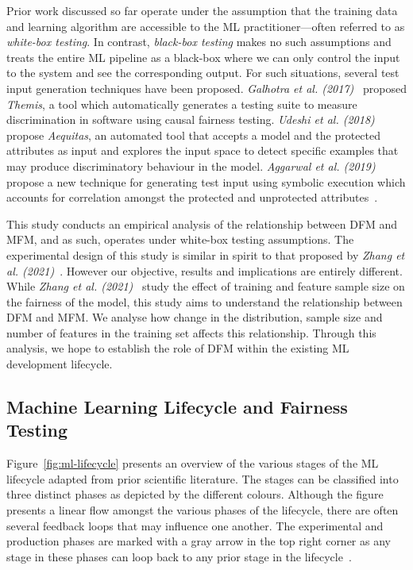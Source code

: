 \documentclass[conference]{IEEEtran}
\begin{document}
Prior work discussed so far operate under the assumption that the training data and learning algorithm are accessible to the ML practitioner---often referred to as \emph{white-box testing}. In contrast, \emph{black-box testing} makes no such assumptions and treats the entire ML pipeline as a black-box where we can only control the input to the system and see the corresponding output. For such situations, several test input generation techniques have been proposed. \emph{Galhotra et al. (2017)}~\cite{galhotra2017fairness} proposed \emph{Themis}, a tool which automatically generates a testing suite to measure discrimination in software using causal fairness testing. \emph{Udeshi et al. (2018)}~\cite{udeshi2018automated} propose \emph{Aequitas}, an automated tool that accepts a model and the protected attributes as input and explores the input space to detect specific examples that may produce discriminatory behaviour in the model. \emph{Aggarwal et al. (2019)}~\cite{aggarwal2019black} propose a new technique for generating test input using symbolic execution which accounts for correlation amongst the protected and unprotected attributes \cite{aggarwal2019black,udeshi2018automated,galhotra2017fairness}.

This study conducts an empirical analysis of the relationship between DFM and MFM, and as such, operates under white-box testing assumptions. The experimental design of this study is similar in spirit to that proposed by \emph{Zhang et al. (2021)}~\cite{zhang2021ignorance}. However our objective, results and implications are entirely different. While \emph{Zhang et al. (2021)}~\cite{zhang2021ignorance} study the effect of training and feature sample size on the fairness of the model, this study aims to understand the relationship between DFM and MFM. We analyse how change in the distribution, sample size and number of features in the training set affects this relationship. Through this analysis, we hope to establish the role of DFM within the existing ML development lifecycle.

\subsection{Machine Learning Lifecycle and Fairness
  Testing}\label{sec:ml-lifecycle}

Figure \ref{fig:ml-lifecycle} presents an overview of the various
stages of the ML lifecycle adapted from prior scientific literature.
The stages can be classified into three distinct phases as depicted by
the different colours. Although the figure presents a linear flow
amongst the various phases of the lifecycle, there are often several
feedback loops that may influence one another. The experimental and
production phases are marked with a gray arrow in the top right corner
as any stage in these phases can loop back to any prior stage in the
lifecycle \cite{amershi2019software,haakman2020ai,breck2019data}.
\end{document}
